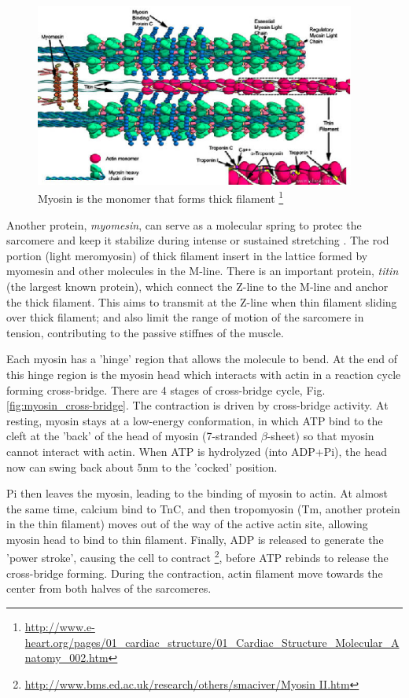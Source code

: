 \begin{figure}[hbt]
  \centerline{\includegraphics[height=6cm,
    angle=0]{./images/thick_thin_filament.eps}}
\caption{Myosin is the monomer that forms thick filament
\footnote{\url{http://www.e-heart.org/pages/01_cardiac_structure/01_Cardiac_Structure_Molecular_Anatomy_002.htm}}}
\label{fig:thick_thin_filament}
\end{figure}


Another protein, {\it myomesin}, can serve as a molecular spring to protec the
sarcomere and keep it stabilize during intense or sustained stretching
\citep{schoenauer2005}. The rod portion (light meromyosin) of thick filament
insert in the lattice formed by myomesin and other molecules in the M-line.
There is an important protein, {\it titin} (the largest known protein), which
connect the Z-line to the M-line and anchor the thick filament. This aims to
transmit at the Z-line when thin filament sliding over thick filament; and also
limit the range of motion of the sarcomere in tension, contributing to the
passive stiffnes of the muscle.

Each myosin has a 'hinge' region that allows the molecule to bend. At the end of
this hinge region is the myosin head which interacts with actin in a reaction
cycle forming cross-bridge. There are 4 stages of cross-bridge cycle,
Fig.\ref{fig:myosin_cross-bridge}. The contraction is driven by cross-bridge
activity.  At resting, myosin stays at a low-energy conformation, in which ATP
bind to the cleft at the 'back' of the head of myosin (7-stranded $\beta$-sheet)
so that myosin cannot interact with actin. When ATP is hydrolyzed (into ADP+Pi),
the head now can swing back about 5nm to the 'cocked' position.

Pi then leaves the myosin, leading to the binding of myosin to actin. At almost
the same time, calcium bind to TnC, and then tropomyosin (Tm, another protein in
the thin filament) moves out of the way of the active actin site, allowing
myosin head to bind to thin filament. Finally, ADP is released to generate the
'power stroke', causing the cell to contract
\footnote{\url{http://www.bms.ed.ac.uk/research/others/smaciver/Myosin II.htm}},
before ATP rebinds to release the cross-bridge forming. During the contraction,
actin filament move towards the center from both halves of the sarcomeres.

